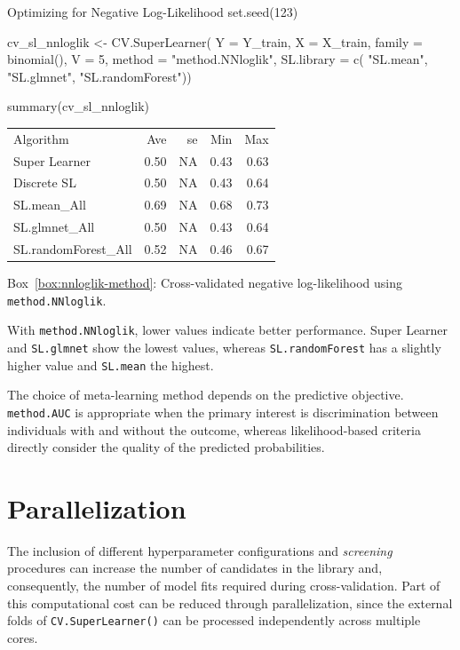 \documentclass[12pt]{article}
\newcommand{\routputcaption}[2]{%
    \par\smallskip
    \begin{center}
        Box~\ref{#1}: #2
    \end{center}
}
\begin{document}
\begin{rcode}[label={code:cvsl-nnloglik}]{Optimizing for Negative Log-Likelihood}
	set.seed(123)
	
	cv_sl_nnloglik <- CV.SuperLearner(
	Y = Y_train, X = X_train,
	family = binomial(),
	V = 5,
	method = "method.NNloglik",
	SL.library = c(
	"SL.mean",
	"SL.glmnet",
	"SL.randomForest"))
	
	summary(cv_sl_nnloglik)
\end{rcode}

\begin{routputboxref}[label={box:nnloglik-method}]
	\ttfamily
	\centering
	\begin{tabular}{lrrrr}
		Algorithm & Ave & se & Min & Max \\
		Super Learner & 0.50 & NA & 0.43 & 0.63 \\
		Discrete SL & 0.50 & NA & 0.43 & 0.64 \\
		SL.mean\_All & 0.69 & NA & 0.68 & 0.73 \\
		SL.glmnet\_All & 0.50 & NA & 0.43 & 0.64 \\
		SL.randomForest\_All & 0.52 & NA & 0.46 & 0.67 \\
	\end{tabular}
\end{routputboxref}

\routputcaption{box:nnloglik-method}
{Cross-validated negative log-likelihood using \texttt{method.NNloglik}.}

With \texttt{method.NNloglik}, lower values indicate better performance. Super Learner and \texttt{SL.glmnet} show the lowest values, whereas \texttt{SL.randomForest} has a slightly higher value and \texttt{SL.mean} the highest.

The choice of meta-learning method depends on the predictive objective. \texttt{method.AUC} is appropriate when the primary interest is discrimination between individuals with and without the outcome, whereas likelihood-based criteria directly consider the quality of the predicted probabilities.

\section{Parallelization}

The inclusion of different hyperparameter configurations and \textit{screening} procedures can increase the number of candidates in the library and, consequently, the number of model fits required during cross-validation. Part of this computational cost can be reduced through parallelization, since the external folds of \texttt{CV.SuperLearner()} can be processed independently across multiple cores.
\end{document}
